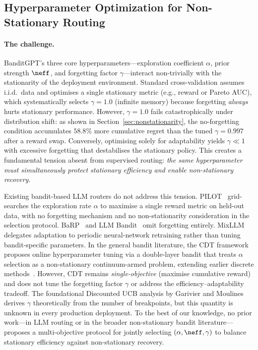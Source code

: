 
\subsection{Hyperparameter Optimization for Non-Stationary Routing}
\label{sec:hparam_sweep}

\paragraph{The challenge.}
BanditGPT's three core hyperparameters---exploration coefficient
$\alpha$, prior strength $\neff$, and forgetting factor
$\gamma$---interact non-trivially with the stationarity of the
deployment environment.
Standard cross-validation assumes i.i.d.\ data and optimises a
single stationary metric (e.g., reward or Pareto AUC), which
systematically selects $\gamma{=}1.0$ (infinite memory)
because forgetting \emph{always} hurts stationary performance.
However, $\gamma{=}1.0$ fails catastrophically under distribution
shift: as shown in Section~\ref{sec:nonstationarity}, the
no-forgetting condition accumulates $58.8\%$ more cumulative regret
than the tuned $\gamma{=}0.997$ after a reward swap.
Conversely, optimising solely for adaptability yields
$\gamma \ll 1$ with excessive forgetting that destabilises the
stationary policy.
This creates a fundamental tension absent from supervised routing:
\emph{the same hyperparameter must simultaneously protect stationary
efficiency and enable non-stationary recovery}.

Existing bandit-based LLM routers do not address this tension.
PILOT~\cite{panda2025pilot} grid-searches the exploration rate
$\alpha$ to maximise a single reward metric on held-out data,
with no forgetting mechanism and no non-stationarity consideration
in the selection protocol.
BaRP~\cite{wang2025barp} and LLM Bandit~\cite{li2025llmbandit}
omit forgetting entirely.
MixLLM~\cite{wang2025mixllm} delegates adaptation to periodic
neural-network retraining rather than tuning bandit-specific
parameters.
In the general bandit literature, the CDT framework~\cite{kang2024cdt}
proposes online hyperparameter tuning via a double-layer bandit that
treats $\alpha$ selection as a non-stationary continuum-armed problem,
extending earlier discrete methods~\cite{bouneffouf2020oplinucb}.
However, CDT remains \emph{single-objective} (maximise cumulative
reward) and does not tune the forgetting factor $\gamma$ or address
the efficiency--adaptability tradeoff.
The foundational Discounted UCB analysis by
Garivier and Moulines~\cite{garivier2011switching} derives $\gamma$
theoretically from the number of breakpoints, but this quantity is
unknown in every production deployment.
To the best of our knowledge, no prior work---in LLM routing or in
the broader non-stationary bandit literature---proposes a
multi-objective protocol for jointly selecting $(\alpha, \neff,
\gamma)$ to balance stationary efficiency against non-stationary
recovery.

